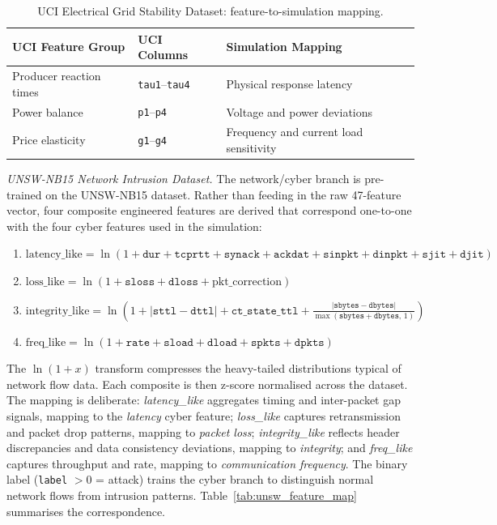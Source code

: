 \begin{table}[H]
\centering
\caption{UCI Electrical Grid Stability Dataset: feature-to-simulation mapping.}
\label{tab:uci_feature_map}
\begin{tabular}{|l|l|l|}
\hline
\textbf{UCI Feature Group} & \textbf{UCI Columns} & \textbf{Simulation Mapping} \\
\hline
Producer reaction times & \texttt{tau1}--\texttt{tau4} & Physical response latency \\
Power balance & \texttt{p1}--\texttt{p4} & Voltage and power deviations \\
Price elasticity & \texttt{g1}--\texttt{g4} & Frequency and current load sensitivity \\
\hline
\end{tabular}
\end{table}

\par \vspace{0.25cm}
\noindent
\textit{UNSW-NB15 Network Intrusion Dataset.} The network/cyber branch is pre-trained on the UNSW-NB15 dataset. Rather than feeding in the raw 47-feature vector, four composite engineered features are derived that correspond one-to-one with the four cyber features used in the simulation:

\begin{enumerate}
    \item $\text{latency\_like} = \ln\!\left(1 + \texttt{dur} + \texttt{tcprtt} + \texttt{synack} + \texttt{ackdat} + \texttt{sinpkt} + \texttt{dinpkt} + \texttt{sjit} + \texttt{djit}\right)$
    \item $\text{loss\_like} = \ln\!\left(1 + \texttt{sloss} + \texttt{dloss} + \text{pkt\_correction}\right)$
    \item $\text{integrity\_like} = \ln\!\left(1 + |\texttt{sttl} - \texttt{dttl}| + \texttt{ct\_state\_ttl} + \tfrac{|\texttt{sbytes} - \texttt{dbytes}|}{\max(\texttt{sbytes}+\texttt{dbytes},\, 1)}\right)$
    \item $\text{freq\_like} = \ln\!\left(1 + \texttt{rate} + \texttt{sload} + \texttt{dload} + \texttt{spkts} + \texttt{dpkts}\right)$
\end{enumerate}

The $\ln(1+x)$ transform compresses the heavy-tailed distributions typical of network flow data. Each composite is then z-score normalised across the dataset. The mapping is deliberate: \textit{latency\_like} aggregates timing and inter-packet gap signals, mapping to the \textit{latency} cyber feature; \textit{loss\_like} captures retransmission and packet drop patterns, mapping to \textit{packet loss}; \textit{integrity\_like} reflects header discrepancies and data consistency deviations, mapping to \textit{integrity}; and \textit{freq\_like} captures throughput and rate, mapping to \textit{communication frequency}. The binary label (\texttt{label} $> 0$ = attack) trains the cyber branch to distinguish normal network flows from intrusion patterns. Table~\ref{tab:unsw_feature_map} summarises the correspondence.

